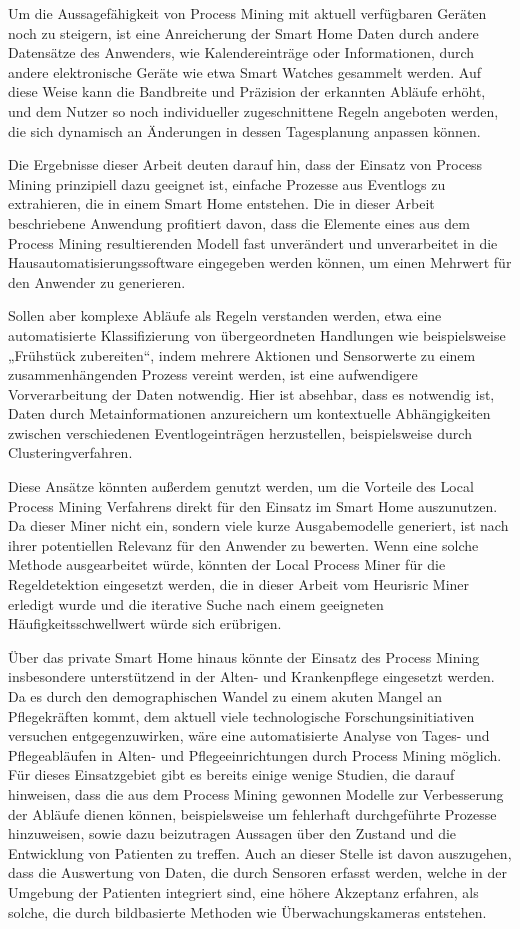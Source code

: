 Um die Aussagefähigkeit von Process Mining mit aktuell verfügbaren Geräten noch zu steigern, ist eine Anreicherung der  Smart Home Daten durch andere Datensätze  des Anwenders, wie Kalendereinträge oder Informationen, durch andere elektronische Geräte wie etwa Smart Watches gesammelt werden. Auf diese Weise kann die Bandbreite und Präzision der erkannten Abläufe erhöht, und dem Nutzer so noch individueller zugeschnittene Regeln angeboten werden, die sich dynamisch an Änderungen in dessen Tagesplanung anpassen können.

Die Ergebnisse dieser Arbeit deuten darauf hin, dass der Einsatz von Process Mining prinzipiell dazu geeignet ist, einfache Prozesse aus Eventlogs zu extrahieren, die in einem Smart Home entstehen. Die in dieser Arbeit beschriebene Anwendung profitiert davon, dass die Elemente eines aus dem Process Mining resultierenden Modell fast unverändert und unverarbeitet in die Hausautomatisierungssoftware eingegeben werden können, um einen Mehrwert für den Anwender zu generieren. 

Sollen aber komplexe Abläufe als Regeln verstanden werden, etwa eine automatisierte Klassifizierung von übergeordneten Handlungen wie beispielsweise „Frühstück zubereiten“, indem mehrere Aktionen und Sensorwerte zu einem zusammenhängenden Prozess vereint werden, ist eine aufwendigere Vorverarbeitung der Daten notwendig. Hier ist absehbar, dass es notwendig ist, Daten durch Metainformationen anzureichern um kontextuelle Abhängigkeiten zwischen verschiedenen Eventlogeinträgen herzustellen, beispielsweise durch Clusteringverfahren. 

Diese Ansätze könnten außerdem genutzt werden, um die Vorteile des Local Process Mining Verfahrens direkt für den Einsatz im Smart Home auszunutzen. Da dieser Miner nicht ein, sondern viele kurze Ausgabemodelle generiert, ist nach ihrer potentiellen Relevanz für den Anwender zu bewerten. Wenn eine solche Methode ausgearbeitet würde, könnten der Local Process Miner für die Regeldetektion eingesetzt werden, die in dieser Arbeit vom Heurisric Miner erledigt wurde und die iterative Suche nach einem geeigneten Häufigkeitsschwellwert würde sich erübrigen.

Über das private Smart Home hinaus könnte der Einsatz des Process Mining insbesondere unterstützend in der Alten- und Krankenpflege eingesetzt werden. Da es durch den demographischen Wandel zu einem akuten Mangel an Pflegekräften kommt, dem aktuell viele technologische Forschungsinitiativen versuchen entgegenzuwirken, wäre eine automatisierte Analyse von Tages- und Pflegeabläufen in Alten- und Pflegeeinrichtungen durch Process Mining möglich. Für dieses Einsatzgebiet gibt es bereits einige wenige Studien, die darauf hinweisen, dass die aus dem Process Mining gewonnen Modelle zur Verbesserung der Abläufe dienen können, beispielsweise um fehlerhaft durchgeführte Prozesse hinzuweisen, sowie dazu beizutragen Aussagen über den Zustand und die Entwicklung von Patienten zu treffen. Auch an dieser Stelle ist davon auszugehen, dass die Auswertung von Daten, die durch Sensoren erfasst werden, welche in der Umgebung der Patienten integriert sind, eine höhere Akzeptanz erfahren, als solche, die durch bildbasierte Methoden wie Überwachungskameras entstehen.


